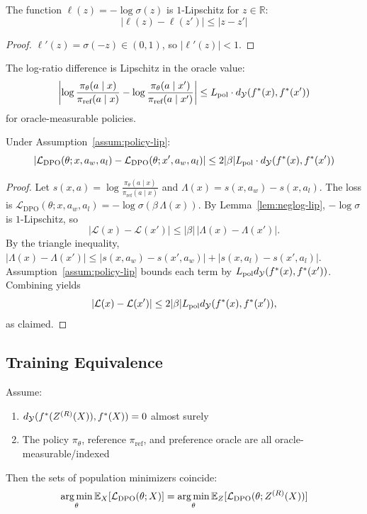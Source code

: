 \begin{lemma}\label{lem:neglog-lip}
The function $\ell(z) = -\log \sigma(z)$ is $1$-Lipschitz for $z \in \mathbb{R}$:
\[
|\ell(z) - \ell(z')| \le |z - z'|
\]
\end{lemma}

\begin{proof}
$\ell'(z) = \sigma(-z) \in (0, 1)$, so $|\ell'(z)| < 1$.
\end{proof}

\begin{assumption}\label{assum:policy-lip}
The log-ratio difference is Lipschitz in the oracle value:
\[
\left|\log \frac{\pi_\theta(a \mid x)}{\pi_{\text{ref}}(a \mid x)} - \log \frac{\pi_\theta(a \mid x')}{\pi_{\text{ref}}(a \mid x')}\right| \le L_{\text{pol}} \cdot d_{\mathcal{Y}}(f^{\ast}(x), f^{\ast}(x'))
\]
for oracle-measurable policies.
\end{assumption}

\begin{theorem}\label{thm:dpo-lip}
Under Assumption~\ref{assum:policy-lip}:
\[
|\mathcal{L}_{\text{DPO}}(\theta; x, a_w, a_l) - \mathcal{L}_{\text{DPO}}(\theta; x', a_w, a_l)| \le 2|\beta| L_{\text{pol}} \cdot d_{\mathcal{Y}}(f^{\ast}(x), f^{\ast}(x'))
\]
\end{theorem}

\begin{proof}
Let $s(x,a)=\log\frac{\pi_\theta(a\mid x)}{\pi_{\text{ref}}(a\mid x)}$ and
$\Lambda(x)=s(x,a_w)-s(x,a_l)$. The loss is
$\mathcal{L}_{\text{DPO}}(\theta;x,a_w,a_l)=-\log\sigma(\beta\,\Lambda(x))$.
By Lemma~\ref{lem:neglog-lip}, $-\log\sigma$ is $1$-Lipschitz, so
\[
|\mathcal{L}(x)-\mathcal{L}(x')|\le |\beta|\,|\Lambda(x)-\Lambda(x')|.
\]
By the triangle inequality,
$
|\Lambda(x)-\Lambda(x')|
\le |s(x,a_w)-s(x',a_w)|+|s(x,a_l)-s(x',a_l)|.
$
Assumption~\ref{assum:policy-lip} bounds each term by
$L_{\text{pol}}d_{\mathcal{Y}}(f^{\ast}(x),f^{\ast}(x'))$. Combining yields
\[
|\mathcal{L}(x)-\mathcal{L}(x')|
\le 2|\beta|L_{\text{pol}}d_{\mathcal{Y}}(f^{\ast}(x),f^{\ast}(x')),
\]
as claimed.
\end{proof}

\subsection{Training Equivalence}

\begin{theorem}\label{app:thm:dpo-equiv}
Assume:
\begin{enumerate}
    \item $d_{\mathcal{Y}}(f^{\ast}(Z^{(R)}(X)), f^{\ast}(X)) = 0$ almost surely
    \item The policy $\pi_\theta$, reference $\pi_{\text{ref}}$, and preference oracle are all oracle-measurable/indexed
\end{enumerate}
Then the sets of population minimizers coincide:
\[
\operatorname*{arg\,min}_\theta \mathbb{E}_X[\mathcal{L}_{\text{DPO}}(\theta; X)] = \operatorname*{arg\,min}_\theta \mathbb{E}_Z[\mathcal{L}_{\text{DPO}}(\theta; Z^{(R)}(X))]
\]
\end{theorem}

